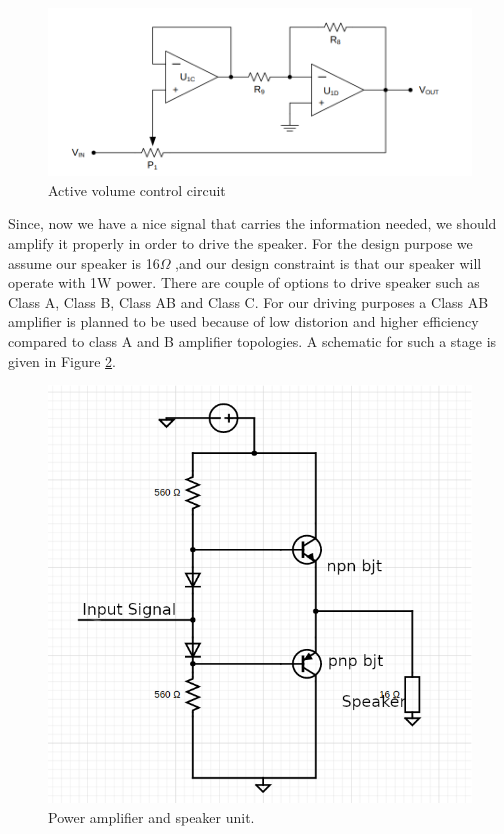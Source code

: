 \documentclass[a4paper,10pt]{IEEEtran}
\begin{document}
\begin{figure}[H] %
    \centering
    \includegraphics[width = 0.75\linewidth]{baxandall_volume_control.png}
    \caption{Active volume control circuit}
    \label{Baxandall}    
\end{figure} 
Since, now we have a nice signal that carries the information needed, we should amplify it properly in order to drive the speaker. For the design purpose we assume our speaker is 16\(\Omega\) ,and our design constraint is that our speaker will operate with 1W power. There are couple of options to drive speaker such as Class A, Class B, Class AB and Class C. For our driving purposes a Class AB amplifier is planned to be used because of low distorion and higher efficiency compared to class A and B amplifier topologies. A schematic for such a stage is given in Figure \ref*{power_amp_sch}.
\begin{figure}[H]
    \centering
    \includegraphics[width = 0.75\linewidth]{power_amp.png}
    \caption{Power amplifier and speaker unit.}
    \label{power_amp_sch}    
\end{figure} 
   
\end{document}
